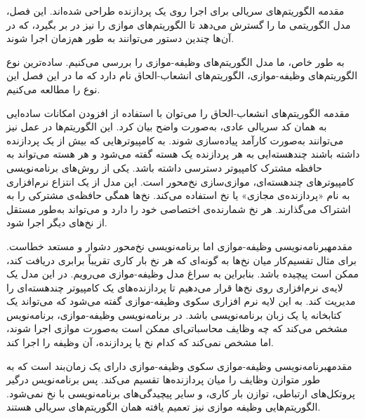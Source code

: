 \begin{itemframe}{مقدمه}
\itm
الگوریتم‌های سریالی
برای اجرا روی یک پردازنده طراحی شده‌اند.
این فصل، مدل الگوریتمی ما را گسترش می‌دهد تا الگوریتم‌های موازی
را نیز در بر بگیرد، که در آن‌ها چندین دستور می‌توانند به طور هم‌زمان اجرا شوند.

\itm
 به طور خاص، ما مدل الگوریتم‌های وظیفه-موازی
را بررسی می‌کنیم.
ساده‌ترین نوع الگوریتم‌های وظیفه-موازی، الگوریتم‌های انشعاب-الحاق
 نام دارد که ما در این فصل این نوع را مطالعه می‌کنیم.
\end{itemframe}


\begin{itemframe}{مقدمه}
\itm
الگوریتم‌های انشعاب-الحاق را می‌توان با استفاده از افزودن امکانات ساده‌ایی به همان کد سریالی عادی، به‌صورت واضح بیان کرد. این الگوریتم‌ها در عمل نیز می‌توانند به‌صورت کارآمد پیاده‌سازی شوند.
\itm
به کامپیوترهایی که بیش‌ از یک پردازنده داشته باشند چندهسته‌ایی
به هر پردازنده یک هسته گفته می‌شود و هر هسته می‌تواند به حافظه مشترک
کامپیوتر دسترسی داشته باشد.
\itm
یکی از روش‌های برنامه‌نویسی کامپیوترهای چند‌هسته‌ای، موازی‌سازی نخ‌محور
است.
این مدل از یک انتزاع نرم‌افزاری به نام «پردازنده‌ی مجازی» یا نخ
استفاده می‌کند. نخ‌ها همگی حافظه‌ی مشترکی را به اشتراک می‌گذارند. هر نخ شمارنده‌ی
اختصاصی خود را دارد و می‌تواند به‌طور مستقل از نخ‌های دیگر اجرا شود.
\end{itemframe}


\begin{itemframe-s}{مقدمه}{برنامه‌نویسی وظیفه-موازی}
\itm
اما برنامه‌نویسی نخ‌محور دشوار و مستعد خطاست. برای مثال تقسیم‌کار میان نخ‌ها به گونه‌ای که هر نخ بار کاری تقریباً برابری دریافت کند، ممکن است پیچیده باشد. بنابراین به سراغ مدل وظیفه-موازی می‌رویم.
\itm
در این مدل یک لایه‌ی نرم‌افزاری روی نخ‌ها قرار می‌دهیم تا پردازنده‌های یک کامپیوتر چند‌هسته‌ای را مدیریت کند. به این لایه نرم افزاری سکوی وظیفه-موازی
گفته می‌شود که می‌تواند یک کتابخانه یا یک زبان برنامه‌نویسی باشد.
\itm
در برنامه‌نویسی وظیفه-موازی، برنامه‌نویس مشخص می‌کند که چه وظایف محاسباتی‌ای ممکن است به‌صورت موازی اجرا شوند، اما مشخص نمی‌کند که کدام نخ یا پردازنده، آن وظیفه را اجرا کند.
\end{itemframe-s}


\begin{itemframe-s}{مقدمه}{برنامه‌نویسی وظیفه-موازی}
\itm
سکوی وظیفه-موازی دارای یک زمان‌بند است که به طور متوازن وظایف را میان پردازنده‌ها تقسیم می‌کند.
\itm
پس برنامه‌نویس درگیر پروتکل‌های ارتباطی، توازن بار کاری، و سایر پیچیدگی‌های برنامه‌نویسی با نخ نمی‌شود.
\itm
الگوریتم‌هایی وظیفه موازی
 نیز تعمیم یافته همان الگوریتم‌های سریالی هستند.
\end{itemframe-s}


